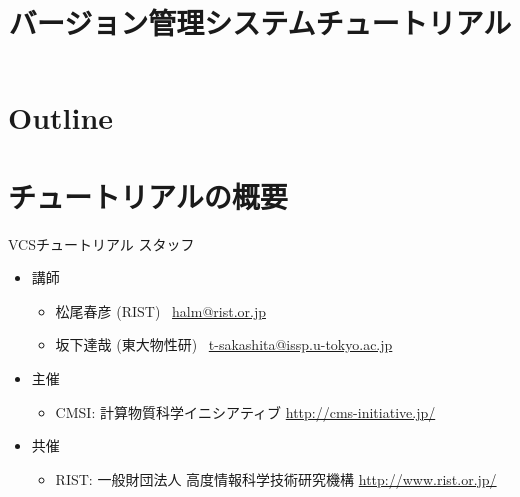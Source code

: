 \title{バージョン管理システムチュートリアル}




\begin{frame}
  \titlepage
\end{frame}

\section*{Outline}
\begin{frame}
  \tableofcontents
\end{frame}

\section{チュートリアルの概要}

\begin{frame}{VCSチュートリアル スタッフ}
  \begin{itemize}
  \item 講師
    \begin{itemize}
    \item 松尾春彦 (RIST) \ \href{mailto:halm@rist.or.jp}{halm@rist.or.jp}
    \item 坂下達哉 (東大物性研) \ \href{mailto:t-sakashita@issp.u-tokyo.ac.jp}{t-sakashita@issp.u-tokyo.ac.jp}

    \end{itemize}
  \item 主催
    \begin{itemize}
    \item CMSI: 計算物質科学イニシアティブ \url{http://cms-initiative.jp/}
    \end{itemize}
  \item 共催
    \begin{itemize}
    \item RIST: 一般財団法人 高度情報科学技術研究機構 \url{http://www.rist.or.jp/}
    \end{itemize}
  \end{itemize}
\end{frame}

